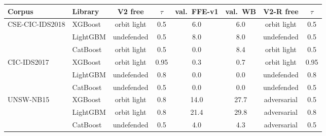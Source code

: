 \begin{tabular}{@{}llcccccc@{}}
\toprule
\textbf{Corpus} & \textbf{Library} & \textbf{V2 free} & \textbf{$\tau$} & \textbf{val.\ FFE-v1} & \textbf{val.\ WB} & \textbf{V2-R free} & \textbf{$\tau$} \\
\midrule
CSE-CIC-IDS2018 & XGBoost & orbit light & 0.5 & 6.0 & 6.0 & orbit light & 0.5 \\
 & LightGBM & undefended & 0.5 & 8.0 & 8.0 & undefended & 0.5 \\
 & CatBoost & orbit light & 0.5 & 0.0 & 8.4 & orbit light & 0.5 \\
\midrule
CIC-IDS2017 & XGBoost & orbit light & 0.95 & 0.3 & 0.7 & orbit light & 0.95 \\
 & LightGBM & undefended & 0.8 & 0.0 & 0.0 & undefended & 0.8 \\
 & CatBoost & undefended & 0.5 & 0.0 & 0.0 & undefended & 0.5 \\
\midrule
UNSW-NB15 & XGBoost & orbit light & 0.8 & 14.0 & 27.7 & adversarial & 0.5 \\
 & LightGBM & orbit light & 0.8 & 21.4 & 29.8 & adversarial & 0.8 \\
 & CatBoost & undefended & 0.5 & 4.0 & 4.3 & adversarial & 0.5 \\
\bottomrule
\end{tabular}
